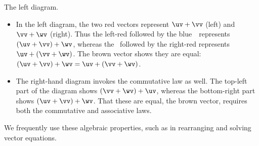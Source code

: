 \begin{example}
\begin{center}
\end{center}
\begin{solution} 
The left diagram.
\begin{itemize}
\item In the left diagram, the two red vectors represent \(\uv+\vv\) (left) and \(\vv+\wv\) (right).
Thus the left-red followed by the blue~\wv\ represents \((\uv+\vv)+\wv\), whereas the \uv\ followed by the right-red represents \(\uv+(\vv+\wv)\).
The brown vector shows they are equal: \((\uv+\vv)+\wv=\uv+(\vv+\wv)\).

\item The right-hand diagram invokes the commutative law as well.
The top-left part of the diagram shows \((\vv+\wv)+\uv\), whereas the bottom-right part shows \((\uv+\vv)+\wv\).
That these are equal, the brown vector, requires both the commutative and associative laws.
\end{itemize}
\end{solution}
\end{example}


We frequently use these algebraic properties, such as in rearranging and solving vector equations. 

